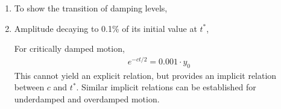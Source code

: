 \begin{enumerate}
\begin{enumerate}
              \item To show the transition of damping levels,
                    \begin{figure}[H]
                        \centering
                    \end{figure}

              \item Amplitude decaying to 0.1\% of its initial value at $ t^{*} $,
                    \par
                    For critically damped motion,
                    \begin{align}
                        [y_{0} + ((c/2) y_{0} + v_{0})t]e^{- ct/2} = 0.001 \cdot y_{0}
                    \end{align}
                    This cannot yield an explicit relation, but provides an implicit
                    relation between $ c $ and $ t^{*} $. Similar implicit relations
                    can be established for underdamped and overdamped motion.


\end{enumerate}
\end{enumerate}
